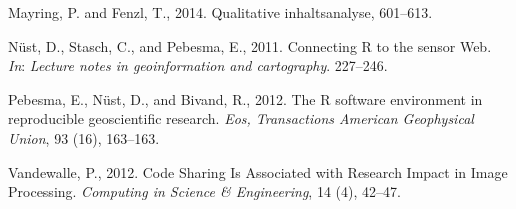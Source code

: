 \documentclass[]{article}
\begin{document}
\hypertarget{ref-Mayring2010}{}
Mayring, P. and Fenzl, T., 2014. Qualitative inhaltsanalyse, 601--613.

\hypertarget{ref-Nuest2011}{}
Nüst, D., Stasch, C., and Pebesma, E., 2011. Connecting R to the sensor
Web. \emph{In}: \emph{Lecture notes in geoinformation and cartography}.
227--246.

\hypertarget{ref-Pebesma2012}{}
Pebesma, E., Nüst, D., and Bivand, R., 2012. The R software environment
in reproducible geoscientific research. \emph{Eos, Transactions American
Geophysical Union}, 93 (16), 163--163.

\hypertarget{ref-Vandewalle2012}{}
Vandewalle, P., 2012. Code Sharing Is Associated with Research Impact in
Image Processing. \emph{Computing in Science \& Engineering}, 14 (4),
42--47.
\end{document}
